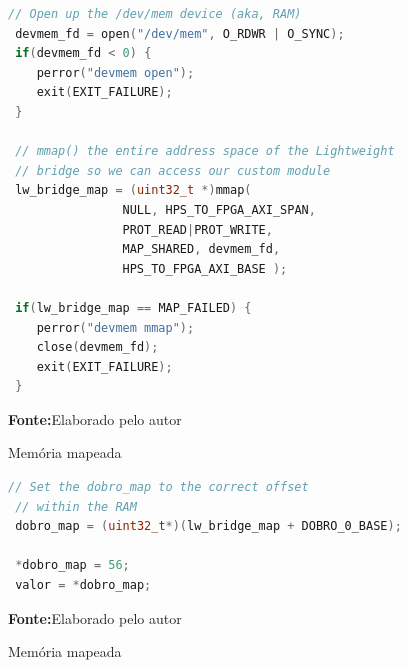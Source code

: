 \begin{figure}[ht]
\caption{Memória mapeada}
\begin{center}
\begin{lstlisting}[language=C++, backgroundcolor=\color{gray!10}]
 // Open up the /dev/mem device (aka, RAM)
 devmem_fd = open("/dev/mem", O_RDWR | O_SYNC);
 if(devmem_fd < 0) {
	perror("devmem open");
	exit(EXIT_FAILURE);
 }	

 // mmap() the entire address space of the Lightweight 
 // bridge so we can access our custom module 
 lw_bridge_map = (uint32_t *)mmap( 
				NULL, HPS_TO_FPGA_AXI_SPAN, 
				PROT_READ|PROT_WRITE, 
				MAP_SHARED, devmem_fd, 
				HPS_TO_FPGA_AXI_BASE ); 
				
 if(lw_bridge_map == MAP_FAILED) {
	perror("devmem mmap");
	close(devmem_fd);
	exit(EXIT_FAILURE);
 }
\end{lstlisting}
{\small \textbf{Fonte:}Elaborado pelo autor}	
\end{center}\label{fig:codigomap}
	
\end{figure} 

\begin{figure}[ht]
\caption{Memória mapeada}
\begin{center}
\begin{lstlisting}[language=C++, backgroundcolor=\color{gray!10}]
 // Set the dobro_map to the correct offset 
 // within the RAM
 dobro_map = (uint32_t*)(lw_bridge_map + DOBRO_0_BASE);

 *dobro_map = 56;
 valor = *dobro_map;
\end{lstlisting}
{\small \textbf{Fonte:}Elaborado pelo autor}	
\end{center}\label{fig:codigomapdobro}
	
\end{figure}